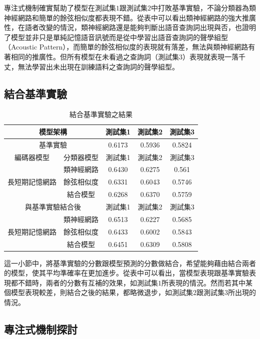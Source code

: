專注式機制確實幫助了模型在測試集$1$跟測試集$2$中打敗基準實驗，不論分類器為類神經網路和簡單的餘弦相似度都表現不錯。從表中可以看出類神經網路的強大推廣性，在語者改變的情況，類神經網路還是能夠判斷出語音查詢詞出現與否，也證明了模型並非只是單純記憶語音訊號而是從中學習出語音查詢詞的聲學組型（Acoustic
Pattern），而簡單的餘弦相似度的表現就有落差，無法與類神經網路有著相同的推廣性。但所有模型在未看過之查詢詞（測試集$3$）表現就表現一落千丈，無法學習出未出現在訓練語料之查詢詞的聲學組型。

\subsection{結合基準實驗}
\begin{table}[ht]
	 \centering
	 \caption{結合基準實驗之結果}
	 \label{table:ch3_late_fusion}
	 \begin{tabular}{|c|c|c|c|c|}
		 \hline
		 \multicolumn{2}{|c|}{模型架構} & 測試集1 & 測試集2 & 測試集3 \\
		 \hline
		 \multicolumn{2}{|c|}{基準實驗} & 0.6173 & 0.5936 & 0.5824\\
		 \hline
		 \hline 
		 編碼器模型 & 分類器模型 & 測試集1 &測試集2 & 測試集3 \\
		 \hline
		 \multirow{3}{*}{長短期記憶網路} & 類神經網路 &
		 0.6430 &0.6275 & 0.561 \\
		 \cline{2-5}
		 & 餘弦相似度& 0.6331 & 0.6043 & 0.5746 \\
		 \cline{2-5}
		 & 結合模型 & 0.6268 & 0.6370 & 0.5759 \\ 
		 \hline
		 \hline
		 \multicolumn{2}{|c|}{與基準實驗結合後} & 測試集1 &測試集2
		 &測試集3 \\
		 \hline
		 \multirow{3}{*}{長短期記憶網路} & 類神經網路 &
		 {\color{red}0.6513} & 0.6227 & 0.5685\\
		 \cline{2-5}
		 & 餘弦相似度& 0.6433&0.6002&0.5843 \\
		 \cline{2-5}
		 & 結合模型 &0.6451&0.6309	&0.5808 \\
		 \hline
	   \end{tabular}
\end{table}

這一小節中，將基準實驗的分數跟模型預測的分數做結合，希望能夠藉由結合兩者的模型，使其平均準確率在更加進步。從表中可以看出，當模型表現跟基準實驗表現都不錯時，兩者的分數有互補的效果，如測試集$1$所表現的情況。然而若其中某個模型表現較差，則結合之後的結果，都略微退步，如測試集$2$跟測試集$3$所出現的情況。
\subsection{專注式機制探討}

